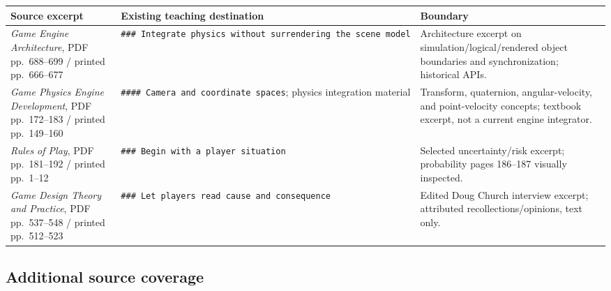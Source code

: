{\def\LTcaptype{none} %
\begin{longtable}[]{@{}
  >{\raggedright\arraybackslash}p{}
  >{\raggedright\arraybackslash}p{}
  >{\raggedright\arraybackslash}p{}@{}}
\toprule\noalign{}
\begin{minipage}[b]{\linewidth}\raggedright
Source excerpt
\end{minipage} & \begin{minipage}[b]{\linewidth}\raggedright
Existing teaching destination
\end{minipage} & \begin{minipage}[b]{\linewidth}\raggedright
Boundary
\end{minipage} \\
\midrule\noalign{}
\endhead
\bottomrule\noalign{}
\endlastfoot
\emph{Game Engine Architecture}, PDF pp.~688--699 / printed pp.~666--677 & \texttt{\#\#\#\ Integrate\ physics\ without\ surrendering\ the\ scene\ model} & Architecture excerpt on simulation/logical/rendered object boundaries and synchronization; historical APIs. \\
\emph{Game Physics Engine Development}, PDF pp.~172--183 / printed pp.~149--160 & \texttt{\#\#\#\#\ Camera\ and\ coordinate\ spaces}; physics integration material & Transform, quaternion, angular-velocity, and point-velocity concepts; textbook excerpt, not a current engine integrator. \\
\emph{Rules of Play}, PDF pp.~181--192 / printed pp.~1--12 & \texttt{\#\#\#\ Begin\ with\ a\ player\ situation} & Selected uncertainty/risk excerpt; probability pages 186--187 visually inspected. \\
\emph{Game Design Theory and Practice}, PDF pp.~537--548 / printed pp.~512--523 & \texttt{\#\#\#\ Let\ players\ read\ cause\ and\ consequence} & Edited Doug Church interview excerpt; attributed recollections/opinions, text only. \\
\end{longtable}
}

\subsection{Additional source coverage}\label{appendix-877738f6f4d2-additional-source-coverage}

